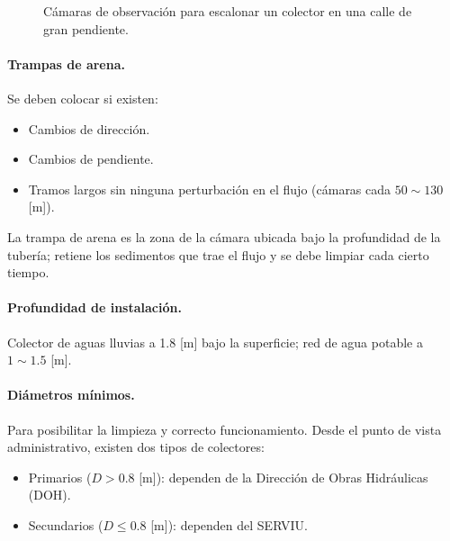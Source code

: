\begin{figure}[H]
\centering
{}
\caption{Cámaras de observación para escalonar un colector en una calle de gran pendiente.}
\end{figure}

\paragraph{Trampas de arena.} Se deben colocar si existen:
\begin{itemize}
  \item Cambios de dirección.
  \item Cambios de pendiente.
  \item Tramos largos sin ninguna perturbación en el flujo (cámaras cada
        $50\sim130$ [m]).
\end{itemize}
La trampa de arena es la zona de la cámara ubicada bajo la profundidad de la
tubería; retiene los sedimentos que trae el flujo y se debe limpiar cada
cierto tiempo.

\paragraph{Profundidad de instalación.} Colector de aguas lluvias a 1.8 [m]
bajo la superficie; red de agua potable a $1\sim1.5$ [m].

\paragraph{Diámetros mínimos.} Para posibilitar la limpieza y correcto
funcionamiento. Desde el punto de vista administrativo, existen dos tipos de
colectores:
\begin{itemize}
  \item Primarios ($D>0.8$ [m]): dependen de la Dirección de Obras Hidráulicas (DOH).
  \item Secundarios ($D\leq0.8$ [m]): dependen del SERVIU.
\end{itemize}

